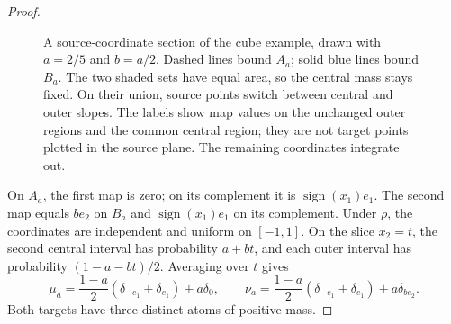\begin{proof}
\begin{figure}[tbp]
\centering
{}
\caption{A source-coordinate section of the cube example, drawn with
$a=2/5$ and $b=a/2$. Dashed lines bound $A_a$; solid blue lines bound
$B_a$. The two shaded sets have equal area, so the central mass stays
fixed. On their union, source points switch between central and outer
slopes. The labels show map values on the unchanged outer regions and
the common central region; they are not target points plotted in the
source plane. The remaining coordinates integrate out.}
\label{fig:sharpness-cells}
\end{figure}

On $A_a$, the first map is zero; on its complement it is
$\operatorname{sign}(x_1)e_1$.  The second map equals $be_2$ on
$B_a$ and $\operatorname{sign}(x_1)e_1$ on its complement.
Under $\rho$, the coordinates are independent and uniform on
$[-1,1]$.  On the slice $x_2=t$, the second central interval has
probability $a+bt$, and each outer interval has probability
$(1-a-bt)/2$.  Averaging over $t$ gives
\begin{equation}\label{sharpness:targets}
 \mu_a=\frac{1-a}{2}(\delta_{-e_1}+\delta_{e_1})+a\delta_0,
 \qquad
 \nu_a=\frac{1-a}{2}(\delta_{-e_1}+\delta_{e_1})+a\delta_{be_2}.
\end{equation}
Both targets have three distinct atoms of positive mass.


\end{proof}
